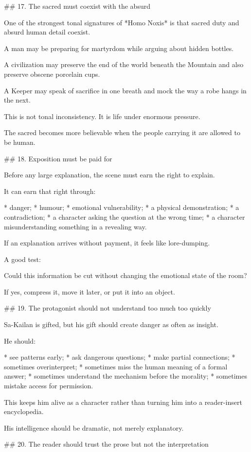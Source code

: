 ## 17. The sacred must coexist with the absurd

One of the strongest tonal signatures of *Homo Noxis* is that sacred duty and absurd human detail coexist.

A man may be preparing for martyrdom while arguing about hidden bottles.

A civilization may preserve the end of the world beneath the Mountain and also preserve obscene porcelain cups.

A Keeper may speak of sacrifice in one breath and mock the way a robe hangs in the next.

This is not tonal inconsistency. It is life under enormous pressure.

The sacred becomes more believable when the people carrying it are allowed to be human.

## 18. Exposition must be paid for

Before any large explanation, the scene must earn the right to explain.

It can earn that right through:

* danger;
* humour;
* emotional vulnerability;
* a physical demonstration;
* a contradiction;
* a character asking the question at the wrong time;
* a character misunderstanding something in a revealing way.

If an explanation arrives without payment, it feels like lore-dumping.

A good test:

Could this information be cut without changing the emotional state of the room?

If yes, compress it, move it later, or put it into an object.

## 19. The protagonist should not understand too much too quickly

Sa-Kailan is gifted, but his gift should create danger as often as insight.

He should:

* see patterns early;
* ask dangerous questions;
* make partial connections;
* sometimes overinterpret;
* sometimes miss the human meaning of a formal answer;
* sometimes understand the mechanism before the morality;
* sometimes mistake access for permission.

This keeps him alive as a character rather than turning him into a reader-insert encyclopedia.

His intelligence should be dramatic, not merely explanatory.

## 20. The reader should trust the prose but not the interpretation

